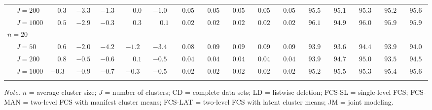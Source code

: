 \begin{sidewaystable}
\begin{threeparttable}
\begin{tabular}{llccccccccccccccc}
 & \nopagebreak $\;J=200$  & $\phantom{-}0.3\phantom{0}$ & ${-}3.3\phantom{0}$ & ${-}1.3\phantom{0}$ & $\phantom{-}0.0\phantom{0}$ & ${-}1.0\phantom{0}$ & $\phantom{0}0.05\phantom{0}$ & $\phantom{0}0.05\phantom{0}$ & $\phantom{0}0.05\phantom{0}$ & $\phantom{0}0.05\phantom{0}$ & $\phantom{0}0.05\phantom{0}$ & $\phantom{0}95.5\phantom{0}$ & $\phantom{0}95.1\phantom{0}$ & $\phantom{0}95.3\phantom{0}$ & $\phantom{0}95.2\phantom{0}$ & $\phantom{0}95.6\phantom{0}$ \\
 & \nopagebreak $\;J=1000$  & $\phantom{-}0.5\phantom{0}$ & ${-}2.9\phantom{0}$ & ${-}0.3\phantom{0}$ & $\phantom{-}0.3\phantom{0}$ & $\phantom{-}0.1\phantom{0}$ & $\phantom{0}0.02\phantom{0}$ & $\phantom{0}0.02\phantom{0}$ & $\phantom{0}0.02\phantom{0}$ & $\phantom{0}0.02\phantom{0}$ & $\phantom{0}0.02\phantom{0}$ & $\phantom{0}96.1\phantom{0}$ & $\phantom{0}94.9\phantom{0}$ & $\phantom{0}96.0\phantom{0}$ & $\phantom{0}95.9\phantom{0}$ & $\phantom{0}95.9\phantom{0}$ \\
\multicolumn{4}{l}{$\bar{n}=20$} \\  & \nopagebreak $\;J=50$  & $\phantom{-}0.6\phantom{0}$ & ${-}2.0\phantom{0}$ & ${-}4.2\phantom{0}$ & ${-}1.2\phantom{0}$ & ${-}3.4\phantom{0}$ & $\phantom{0}0.08\phantom{0}$ & $\phantom{0}0.09\phantom{0}$ & $\phantom{0}0.09\phantom{0}$ & $\phantom{0}0.09\phantom{0}$ & $\phantom{0}0.09\phantom{0}$ & $\phantom{0}93.9\phantom{0}$ & $\phantom{0}93.6\phantom{0}$ & $\phantom{0}94.4\phantom{0}$ & $\phantom{0}93.9\phantom{0}$ & $\phantom{0}94.0\phantom{0}$ \\
 & \nopagebreak $\;J=200$  & $\phantom{-}0.8\phantom{0}$ & ${-}0.5\phantom{0}$ & ${-}0.6\phantom{0}$ & $\phantom{-}0.1\phantom{0}$ & ${-}0.5\phantom{0}$ & $\phantom{0}0.04\phantom{0}$ & $\phantom{0}0.04\phantom{0}$ & $\phantom{0}0.04\phantom{0}$ & $\phantom{0}0.04\phantom{0}$ & $\phantom{0}0.04\phantom{0}$ & $\phantom{0}93.9\phantom{0}$ & $\phantom{0}94.7\phantom{0}$ & $\phantom{0}95.0\phantom{0}$ & $\phantom{0}93.5\phantom{0}$ & $\phantom{0}94.5\phantom{0}$ \\
 & \nopagebreak $\;J=1000$  & ${-}0.3\phantom{0}$ & ${-}0.9\phantom{0}$ & ${-}0.7\phantom{0}$ & ${-}0.3\phantom{0}$ & ${-}0.5\phantom{0}$ & $\phantom{0}0.02\phantom{0}$ & $\phantom{0}0.02\phantom{0}$ & $\phantom{0}0.02\phantom{0}$ & $\phantom{0}0.02\phantom{0}$ & $\phantom{0}0.02\phantom{0}$ & $\phantom{0}95.2\phantom{0}$ & $\phantom{0}95.5\phantom{0}$ & $\phantom{0}95.3\phantom{0}$ & $\phantom{0}95.4\phantom{0}$ & $\phantom{0}95.6\phantom{0}$ \\
[0.5ex]\hline\\[-1.6ex] 
\end{tabular}
\begin{tablenotes}{\footnotesize \textit{Note.} $\bar{n}$ = average cluster size; $J$ = number of clusters; CD = complete data sets; LD = listwise deletion; FCS-SL = single-level FCS; FCS-MAN = two-level FCS with manifest cluster means; FCS-LAT = two-level FCS with latent cluster means; JM = joint modeling.}\end{tablenotes}
\end{threeparttable}
\end{sidewaystable}
